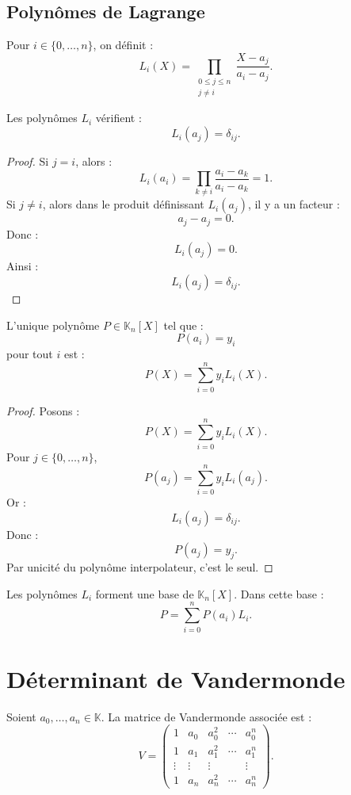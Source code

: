 \documentclass[11pt,a4paper]{article}
\newcommand{\K}{\mathbb K}
\begin{document}
\subsection{Polynômes de Lagrange}

\begin{definitionbox}
Pour \(i\in\{0,\dots,n\}\), on définit :
\[
L_i(X)=\prod_{\substack{0\leq j\leq n\\ j\neq i}}
\frac{X-a_j}{a_i-a_j}.
\]
\end{definitionbox}

\begin{theorembox}
Les polynômes \(L_i\) vérifient :
\[
L_i(a_j)=\delta_{ij}.
\]
\end{theorembox}

\begin{proof}
Si \(j=i\), alors :
\[
L_i(a_i)=
\prod_{k\neq i}
\frac{a_i-a_k}{a_i-a_k}=1.
\]
Si \(j\neq i\), alors dans le produit définissant \(L_i(a_j)\), il y a un facteur :
\[
a_j-a_j=0.
\]
Donc :
\[
L_i(a_j)=0.
\]
Ainsi :
\[
L_i(a_j)=\delta_{ij}.
\]
\end{proof}

\begin{theorembox}
L'unique polynôme \(P\in\K_n[X]\) tel que :
\[
P(a_i)=y_i
\]
pour tout \(i\) est :
\[
P(X)=\sum_{i=0}^n y_iL_i(X).
\]
\end{theorembox}

\begin{proof}
Posons :
\[
P(X)=\sum_{i=0}^n y_iL_i(X).
\]
Pour \(j\in\{0,\dots,n\}\),
\[
P(a_j)=\sum_{i=0}^n y_iL_i(a_j).
\]
Or :
\[
L_i(a_j)=\delta_{ij}.
\]
Donc :
\[
P(a_j)=y_j.
\]
Par unicité du polynôme interpolateur, c'est le seul.
\end{proof}

\begin{retenirbox}
Les polynômes \(L_i\) forment une base de \(\K_n[X]\).  
Dans cette base :
\[
P=\sum_{i=0}^n P(a_i)L_i.
\]
\end{retenirbox}

\section{Déterminant de Vandermonde}

\begin{definitionbox}
Soient \(a_0,\dots,a_n\in\K\).  
La matrice de Vandermonde associée est :
\[
V=
\begin{pmatrix}
1&a_0&a_0^2&\cdots&a_0^n\\
1&a_1&a_1^2&\cdots&a_1^n\\
\vdots&\vdots&\vdots&&\vdots\\
1&a_n&a_n^2&\cdots&a_n^n
\end{pmatrix}.
\]
\end{definitionbox}
\end{document}
